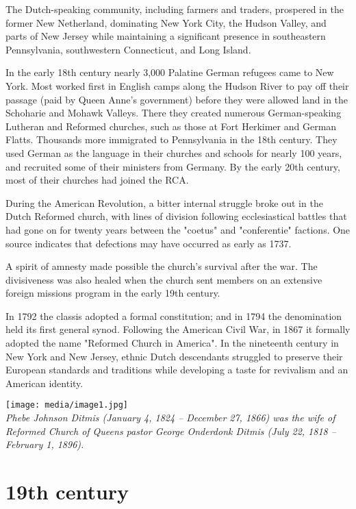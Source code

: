 The Dutch-speaking community, including farmers and traders, prospered
in the former New Netherland, dominating New York City, the Hudson
Valley, and parts of New Jersey while maintaining a significant presence
in southeastern Pennsylvania, southwestern Connecticut, and Long Island.

In the early 18th century nearly 3,000 Palatine German refugees came to
New York. Most worked first in English camps along the Hudson River to
pay off their passage (paid by Queen Anne's government) before they were
allowed land in the Schoharie and Mohawk Valleys. There they created
numerous German-speaking Lutheran and Reformed churches, such as those
at Fort Herkimer and German Flatts. Thousands more immigrated to
Pennsylvania in the 18th century. They used German as the language in
their churches and schools for nearly 100 years, and recruited some of
their ministers from Germany. By the early 20th century, most of their
churches had joined the RCA.

During the American Revolution, a bitter internal struggle broke out in
the Dutch Reformed church, with lines of division following
ecclesiastical battles that had gone on for twenty years between the
"coetus" and "conferentie" factions. One source indicates that
defections may have occurred as early as 1737.

A spirit of amnesty made possible the church's survival after the war.
The divisiveness was also healed when the church sent members on an
extensive foreign missions program in the early 19th century.

In 1792 the classis adopted a formal constitution; and in 1794 the
denomination held its first general synod. Following the American Civil
War, in 1867 it formally adopted the name "Reformed Church in America".
In the nineteenth century in New York and New Jersey, ethnic Dutch
descendants struggled to preserve their European standards and
traditions while developing a taste for revivalism and an American
identity.

\texttt{[image: media/image1.jpg]}\\
\emph{Phebe Johnson Ditmis (January 4, 1824 -- December 27, 1866) was
the wife of Reformed Church of Queens pastor George Onderdonk Ditmis
(July 22, 1818 -- February 1, 1896).}

\section{19th century}\label{th-century}

